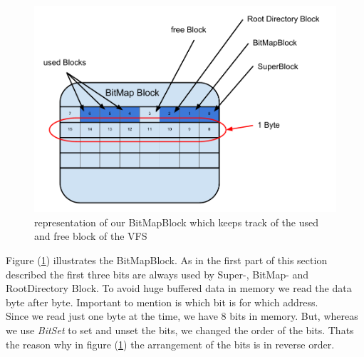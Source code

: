 \documentclass[a4paper,12pt]{article}
\begin{document}
\begin{figure}[h]
\begin{center}
\includegraphics[scale=0.5]{images/BitMapBlock.pdf}
\caption{representation of our BitMapBlock which keeps track of the used and free block of the VFS}
\label{bitmapblock}
\end{center}
\end{figure}

Figure (\ref{bitmapblock}) illustrates the BitMapBlock. As in the first part of this section described the first three bits are always used by Super-, BitMap- and RootDirectory Block. To avoid huge buffered data in memory we read the data byte after byte. Important to mention is which bit is for which address.\\
Since we read just one byte at the time, we have 8 bits in memory. But, whereas we use \emph{BitSet} to set and unset the bits, we changed the order of the bits. Thats the reason why in figure (\ref{bitmapblock}) the arrangement of the bits is in reverse order.
\end{document}
